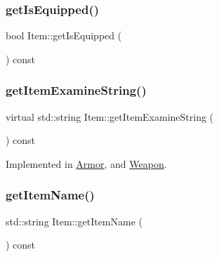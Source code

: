 \subsubsection{\texorpdfstring{get\+Is\+Equipped()}{getIsEquipped()}}
{\footnotesize\ttfamily bool Item\+::get\+Is\+Equipped (\begin{DoxyParamCaption}{ }\end{DoxyParamCaption}) const}

\mbox{\label{class_item_a00e06647e1adeb62f2d95044476126ac}} 
\subsubsection{\texorpdfstring{get\+Item\+Examine\+String()}{getItemExamineString()}}
{\footnotesize\ttfamily virtual std\+::string Item\+::get\+Item\+Examine\+String (\begin{DoxyParamCaption}{ }\end{DoxyParamCaption}) const\hspace{0.3cm}{\ttfamily [pure virtual]}}



Implemented in \mbox{\hyperlink{class_armor_a731bb4d1fe53070f30a336db82fada2c}{Armor}}, and \mbox{\hyperlink{class_weapon_aa52cecf0a3c34aba70a6425c36d40afa}{Weapon}}.

\mbox{\label{class_item_a806159273f1f9fbb07fe75a74f2f51c5}} 
\subsubsection{\texorpdfstring{get\+Item\+Name()}{getItemName()}}
{\footnotesize\ttfamily std\+::string Item\+::get\+Item\+Name (\begin{DoxyParamCaption}{ }\end{DoxyParamCaption}) const}

